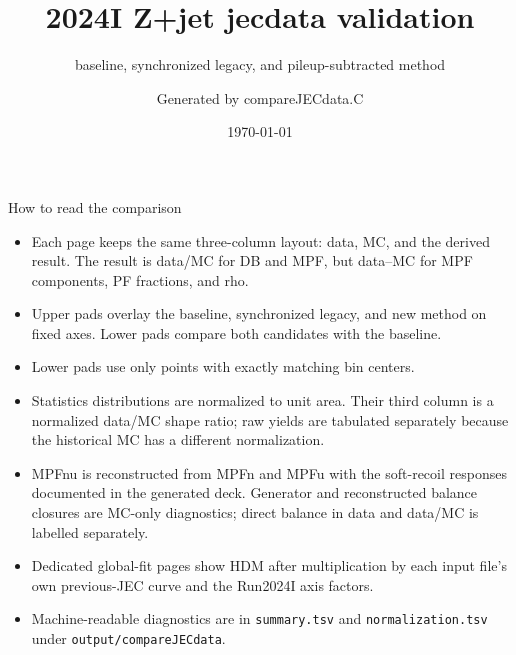 \documentclass[aspectratio=169,9pt]{beamer}
\title{2024I Z+jet jecdata validation}
\subtitle{baseline, synchronized legacy, and pileup-subtracted method}
\author{Generated by compareJECdata.C}
\date{\today}
\begin{document}
\begin{frame}
  \titlepage
\end{frame}

\begin{frame}{How to read the comparison}
  \begin{itemize}
    \item Each page keeps the same three-column layout: data, MC, and the
          derived result. The result is data/MC for DB and MPF, but data--MC
          for MPF components, PF fractions, and rho.
    \item Upper pads overlay the baseline, synchronized legacy, and new method
          on fixed axes. Lower pads compare both candidates with the baseline.
    \item Lower pads use only points with exactly matching bin centers.
    \item Statistics distributions are normalized to unit area. Their third
          column is a normalized data/MC shape ratio; raw yields are tabulated
          separately because the historical MC has a different normalization.
    \item MPFnu is reconstructed from MPFn and MPFu with the soft-recoil
          responses documented in the generated deck. Generator and
          reconstructed balance closures are MC-only diagnostics; direct
          balance in data and data/MC is labelled separately.
    \item Dedicated global-fit pages show HDM after multiplication by each
          input file's own previous-JEC curve and the Run2024I axis factors.
    \item Machine-readable diagnostics are in \texttt{summary.tsv} and
          \texttt{normalization.tsv} under \texttt{output/compareJECdata}.
  \end{itemize}
\end{frame}


\end{document}
